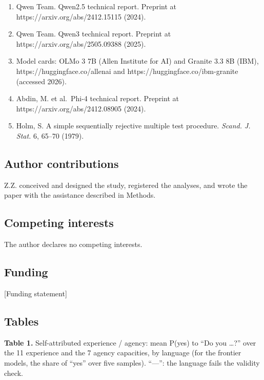 \documentclass[
  11pt,
]{article}
\begin{document}
\begin{enumerate}
  models and humans. \emph{Nat. Hum. Behav.} 8, 1285--1295 (2024).
\item
  Qwen Team. Qwen2.5 technical report. Preprint at
  https://arxiv.org/abs/2412.15115 (2024).
\item
  Qwen Team. Qwen3 technical report. Preprint at
  https://arxiv.org/abs/2505.09388 (2025).
\item
  Model cards: OLMo 3 7B (Allen Institute for AI) and Granite 3.3 8B
  (IBM), https://huggingface.co/allenai and
  https://huggingface.co/ibm-granite (accessed 2026).
\item
  Abdin, M. et al.~Phi-4 technical report. Preprint at
  https://arxiv.org/abs/2412.08905 (2024).
\item
  Holm, S. A simple sequentially rejective multiple test procedure.
  \emph{Scand. J. Stat.} 6, 65--70 (1979).
\end{enumerate}

\hypertarget{author-contributions}{%
\subsection{Author contributions}\label{author-contributions}}

Z.Z. conceived and designed the study, registered the analyses, and
wrote the paper with the assistance described in Methods.

\hypertarget{competing-interests}{%
\subsection{Competing interests}\label{competing-interests}}

The author declares no competing interests.

\hypertarget{funding}{%
\subsection{Funding}\label{funding}}

{[}Funding statement{]}

\hypertarget{tables}{%
\subsection{Tables}\label{tables}}

\textbf{Table 1.} Self-attributed experience / agency: mean P(yes) to
``Do you \ldots?'' over the 11 experience and the 7 agency capacities,
by language (for the frontier models, the share of ``yes'' over five
samples). ``---'': the language fails the validity check.
\end{document}

